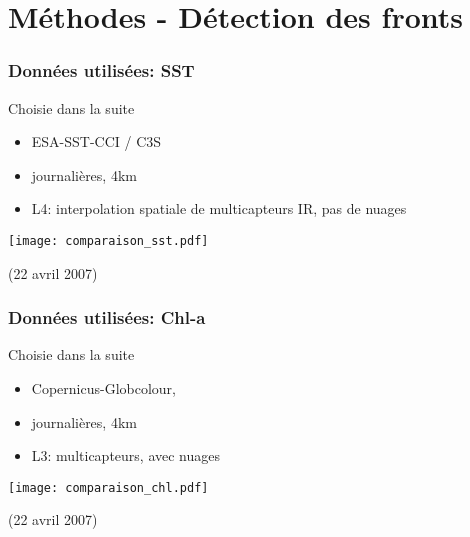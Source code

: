 \documentclass[11pt, french, aspectratio=32]{beamer}
\begin{document}

\section*{Méthodes - Détection des fronts}

\begin{frame}
\end{frame}


\begin{frame}
  \frametitle{Données utilisées: SST}

  \begin{block}{Choisie dans la suite}
    \begin{itemize}
      \item ESA-SST-CCI / C3S
      \item journalières, 4km
      \item L4: interpolation spatiale de multicapteurs IR, pas de nuages
    \end{itemize}
  \end{block}

  \vfill

  \texttt{[image: comparaison\_sst.pdf]}%
  \hspace{0.5cm}%
  {\scriptsize (22 avril 2007)\par}

\end{frame}


\begin{frame}
  \frametitle{Données utilisées: Chl-a}

  \begin{block}{Choisie dans la suite}
    \begin{itemize}
      \item Copernicus-Globcolour,
      \item journalières, 4km
      \item L3: multicapteurs, avec nuages
    \end{itemize}
  \end{block}

  \vfill

  \texttt{[image: comparaison\_chl.pdf]}%
  \hspace{0.5cm}%
  {\scriptsize (22 avril 2007)\par}

\end{frame}
\end{document}
